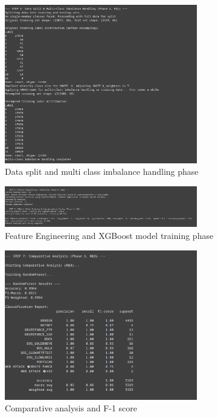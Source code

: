 \begin{figure}[H]
     \centering
     \includegraphics[width=0.75\textwidth]{assets/figures/outputs/3.png}
     \caption{Data split and multi class imbalance handling phase}
 \end{figure}
 
 \begin{figure}[H]
     \centering
     \includegraphics[width=0.75\textwidth]{assets/figures/outputs/4.png}
     \caption{Feature Engineering and XGBoost model training phase}
     \label{fig:xgboost_best_hp_search} 
 \end{figure}
 
 \begin{figure}[H]
     \centering
     \includegraphics[width=0.75\textwidth]{assets/figures/outputs/5.png}
     \caption{Comparative analysis and F-1 score}
     \label{fig:f-1_score} 
 \end{figure}
 
